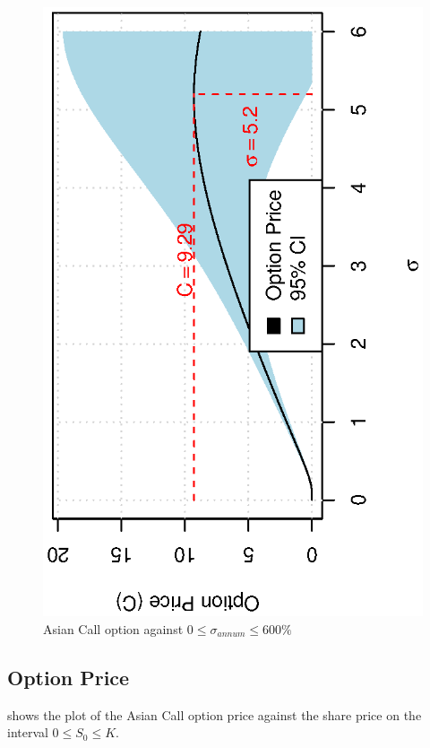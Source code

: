 \documentclass[12pt,a4paper]{article}
\begin{document}
\begin{figure}[!ht]
  \centering
  \includegraphics[scale=0.85,angle=-90]{./images/pseudo/priceOptionSigma600.eps}
  \caption{Asian Call option against $0\leq \sigma_{annum} \leq 600 \%$}
  \label{fig:sigma2_brackets}
\end{figure}

\subsection{Option Price}
\label{sec:option-price}

 shows the plot of the Asian Call
option price against the share price on the interval $0 \le S_{0}
\leq K$.
\end{document}
